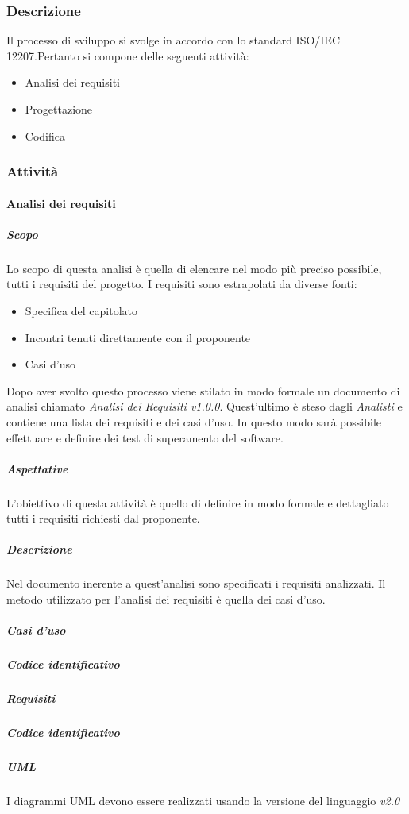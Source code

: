 	\subsubsection{Descrizione}
	Il processo di sviluppo si svolge in accordo con lo standard ISO/IEC 12207.Pertanto si compone delle seguenti attività:
	\begin{itemize}
		\item Analisi dei requisiti
		\item Progettazione
		\item Codifica
	\end{itemize}
	
	\subsubsection{Attività}
		\paragraph{Analisi dei requisiti}
			\subparagraph{Scopo}
			Lo scopo di questa analisi è quella di elencare nel modo più preciso possibile, tutti i requisiti del progetto. 
			I requisiti sono estrapolati da diverse fonti:
				\begin{itemize}
				\item Specifica del capitolato 
				\item Incontri tenuti direttamente con il proponente
				\item Casi d'uso
			\end{itemize}
		    Dopo aver svolto questo processo viene stilato in modo formale un documento di analisi chiamato \textit{Analisi dei Requisiti v1.0.0}.
		    Quest'ultimo è steso dagli \emph{Analisti} e contiene una lista dei requisiti e dei casi d'uso.
		    In questo modo sarà possibile effettuare e definire dei test di superamento del software. 
			\subparagraph{Aspettative}
			L'obiettivo di questa attività è quello di definire in modo formale e dettagliato tutti i requisiti richiesti dal proponente.
			\subparagraph{Descrizione}
			Nel documento inerente a quest'analisi sono specificati i requisiti analizzati.
			Il metodo utilizzato per l'analisi dei requisiti è quella dei casi d'uso.
			\subparagraph{Casi d'uso}
			\subparagraph{Codice identificativo}
			\subparagraph{Requisiti}
			\subparagraph{Codice identificativo}
			\subparagraph{UML}
			I diagrammi UML devono essere realizzati usando la versione del linguaggio \textit{v2.0}
